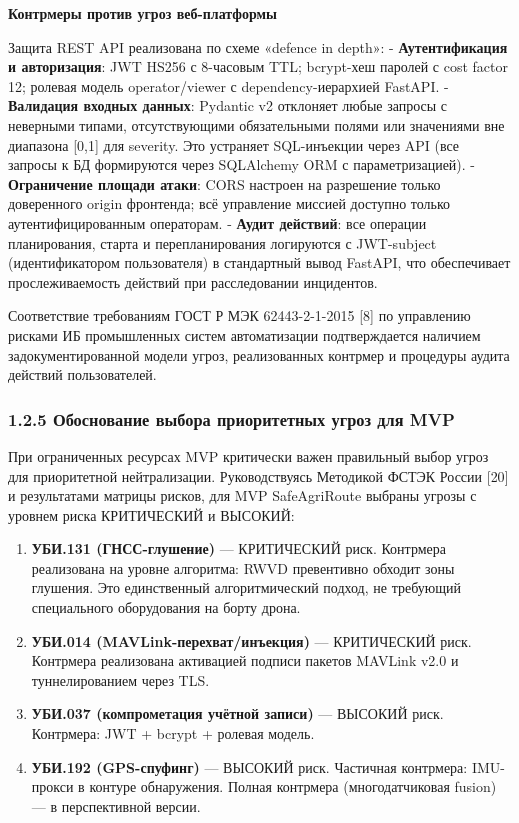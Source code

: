 \textbf{Контрмеры против угроз веб-платформы}

Защита REST API реализована по схеме «defence in depth»: - \textbf{Аутентификация и авторизация}: JWT HS256 с 8-часовым TTL; bcrypt-хеш паролей с cost factor 12; ролевая модель operator/viewer с dependency-иерархией FastAPI. - \textbf{Валидация входных данных}: Pydantic v2 отклоняет любые запросы с неверными типами, отсутствующими обязательными полями или значениями вне диапазона {[}0,1{]} для severity. Это устраняет SQL-инъекции через API (все запросы к БД формируются через SQLAlchemy ORM с параметризацией). - \textbf{Ограничение площади атаки}: CORS настроен на разрешение только доверенного origin фронтенда; всё управление миссией доступно только аутентифицированным операторам. - \textbf{Аудит действий}: все операции планирования, старта и перепланирования логируются с JWT-subject (идентификатором пользователя) в стандартный вывод FastAPI, что обеспечивает прослеживаемость действий при расследовании инцидентов.

Соответствие требованиям ГОСТ Р МЭК 62443-2-1-2015 {[}8{]} по управлению рисками ИБ промышленных систем автоматизации подтверждается наличием задокументированной модели угроз, реализованных контрмер и процедуры аудита действий пользователей.

\hypertarget{ux43eux431ux43eux441ux43dux43eux432ux430ux43dux438ux435-ux432ux44bux431ux43eux440ux430-ux43fux440ux438ux43eux440ux438ux442ux435ux442ux43dux44bux445-ux443ux433ux440ux43eux437-ux434ux43bux44f-mvp}{%
\subsubsection{1.2.5 Обоснование выбора приоритетных угроз для MVP}\label{ux43eux431ux43eux441ux43dux43eux432ux430ux43dux438ux435-ux432ux44bux431ux43eux440ux430-ux43fux440ux438ux43eux440ux438ux442ux435ux442ux43dux44bux445-ux443ux433ux440ux43eux437-ux434ux43bux44f-mvp}}

При ограниченных ресурсах MVP критически важен правильный выбор угроз для приоритетной нейтрализации. Руководствуясь Методикой ФСТЭК России {[}20{]} и результатами матрицы рисков, для MVP SafeAgriRoute выбраны угрозы с уровнем риска КРИТИЧЕСКИЙ и ВЫСОКИЙ:

\begin{enumerate}
\def\labelenumi{\arabic{enumi}.}
\item
  \textbf{УБИ.131 (ГНСС-глушение)} --- КРИТИЧЕСКИЙ риск. Контрмера реализована на уровне алгоритма: RWVD превентивно обходит зоны глушения. Это единственный алгоритмический подход, не требующий специального оборудования на борту дрона.
\item
  \textbf{УБИ.014 (MAVLink-перехват/инъекция)} --- КРИТИЧЕСКИЙ риск. Контрмера реализована активацией подписи пакетов MAVLink v2.0 и туннелированием через TLS.
\item
  \textbf{УБИ.037 (компрометация учётной записи)} --- ВЫСОКИЙ риск. Контрмера: JWT + bcrypt + ролевая модель.
\item
  \textbf{УБИ.192 (GPS-спуфинг)} --- ВЫСОКИЙ риск. Частичная контрмера: IMU-прокси в контуре обнаружения. Полная контрмера (многодатчиковая fusion) --- в перспективной версии.
\end{enumerate}

